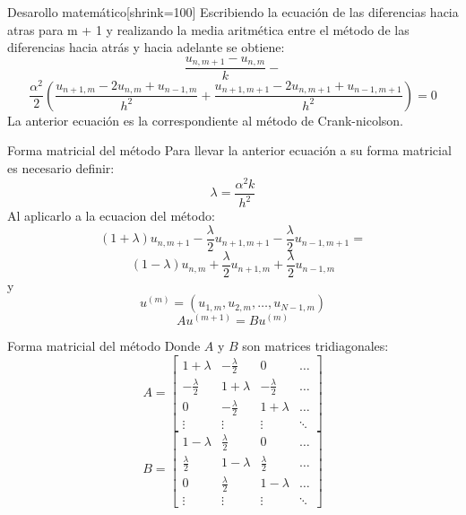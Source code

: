 \documentclass{beamer}
\begin{document}
\begin{frame}{Desarollo matemático}[shrink=100]
Escribiendo la ecuación de las diferencias hacia atras para m + 1 y realizando la media aritmética entre el método de las diferencias hacia atrás y hacia adelante se obtiene: 
$$\frac{u_{n,m+1}-u_{n,m}}{k}-$$
$$\frac{\alpha^2}{2}(\frac{u_{n+1,m}-2u_{n,m}+u_{n-1,m}}{h^2}+\frac{u_{n+1,m+1}-2u_{n,m+1}+u_{n-1,m+1}}{h^2})=0$$
La anterior ecuación es la correspondiente al método de Crank-nicolson.
\end{frame}
\begin{frame}{Forma matricial del método}
Para llevar la anterior ecuación a su forma matricial es necesario definir:
$$\lambda=\dfrac{\alpha^{2}k}{h^{2}}$$
Al aplicarlo a la ecuacion del método:
$$(1+\lambda)u_{n,m+1}-\frac{\lambda}{2}u_{n+1,m+1}-\frac{\lambda}{2}u_{n-1,m+1}=$$
$$(1-\lambda)u_{n,m}+\frac{\lambda}{2}u_{n+1,m}+\frac{\lambda}{2}u_{n-1,m}$$
y
$$u^{(m)}=(u_{1,m},u_{2,m},\ldots,u_{N-1,m})$$
$$Au^{(m+1)}=Bu^{(m)}$$
\end{frame}
\begin{frame}{Forma matricial del método}
Donde $A$ y $B$ son matrices tridiagonales:
$$
A=
\begin{bmatrix}
  1+\lambda  & -\frac{\lambda}{2} & 0 & \ldots\\ 
 -\frac{\lambda}{2} & 1+\lambda & -\frac{\lambda}{2} & \ldots\\ 
 0 & -\frac{\lambda}{2} & 1+\lambda & \ldots\\ 
 \vdots & \vdots & \vdots & \ddots 
\end{bmatrix}
$$
$$
B=
\begin{bmatrix}
 1-\lambda  & \frac{\lambda}{2} & 0 & \ldots\\ 
 \frac{\lambda}{2} & 1-\lambda & \frac{\lambda}{2} & \ldots\\ 
 0 & \frac{\lambda}{2} & 1-\lambda & \ldots\\ 
 \vdots & \vdots & \vdots & \ddots 
\end{bmatrix}
$$
\end{frame}
\begin{frame}
\end{frame}
\begin{frame}
\end{frame}
\begin{frame}
\end{frame}
\begin{frame}
\end{frame}
\begin{frame}
\end{frame}
\begin{frame}
\end{frame}
\begin{frame}
\end{frame}
\begin{frame}
\end{frame}
\begin{frame}
\end{frame}
\end{document}
